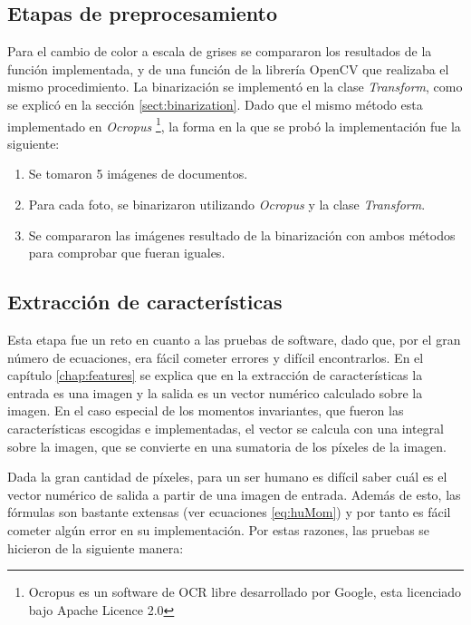 \documentclass[a4paper, 11pt, oneside]{report}
\begin{document}
\subsection{Etapas de preprocesamiento}

Para el cambio de color a escala de grises se compararon los resultados de la función implementada, y de una función de la librería OpenCV que realizaba el mismo procedimiento. La binarización se implementó en la clase {\it Transform}, como se explicó en la sección \ref{sect:binarization}. Dado que el mismo método esta implementado en {\it Ocropus} \footnote{Ocropus es un software de OCR libre desarrollado por Google, esta licenciado bajo Apache Licence 2.0}, la forma en la que se probó la implementación fue la siguiente:

	\begin{enumerate}
	\item Se tomaron 5 imágenes de documentos.
	\item Para cada foto, se binarizaron utilizando {\it Ocropus} y la clase {\it Transform}.
	\item Se compararon las imágenes resultado de la binarización con ambos métodos para comprobar que fueran iguales.
	\end{enumerate}

\subsection{Extracción de características}

Esta etapa fue un reto en cuanto a las pruebas de software, dado que, por el gran número de ecuaciones, era fácil cometer errores y difícil encontrarlos. En el capítulo \ref{chap:features} se explica que en la extracción de características la entrada es una imagen y la salida es un vector numérico calculado sobre la imagen. En el caso especial de los momentos invariantes, que fueron las características escogidas e implementadas, el vector se calcula con una integral sobre la imagen, que se convierte en una sumatoria de los píxeles de la imagen.

Dada la gran cantidad de píxeles, para un ser humano es difícil saber cuál es el vector numérico de salida a partir de una imagen de entrada. Además de esto, las fórmulas son bastante extensas (ver ecuaciones \ref{eq:huMom}) y por tanto es fácil cometer algún error en su implementación. Por estas razones, las pruebas se hicieron de la siguiente manera:
\end{document}
